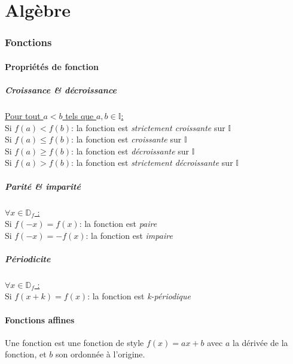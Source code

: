 \documentclass{article}
\begin{document}
\pagebreak

\tableofcontents

\pagebreak

\pagebreak\part{Algèbre}
\setcounter{section}{0}
\renewcommand*{\theHsection}{chX.\the\value{section}}
\section{Fonctions}


\subsection{Propriétés de fonction}

\subsubsection{Croissance \& décroissance}
\underline{Pour tout $a<b$ tels que $a,b\in\mathbb{I}$:}\\
Si $f(a) < f(b)$: la fonction est \emph{strictement croissante} sur $\mathbb{I}$\\
Si $f(a) \le f(b)$: la fonction est \emph{croissante} sur $\mathbb{I}$\\
Si $f(a) \ge f(b)$: la fonction est \emph{décroissante} sur $\mathbb{I}$\\
Si $f(a) > f(b)$: la fonction est \emph{strictement décroissante} sur $\mathbb{I}$\\

\subsubsection{Parité \& imparité}
\underline{$\forall x \in \mathbb{D}_f$ :}\\
Si $f(-x) = f(x)$: la fonction est \emph{paire}\\
Si $f(-x) = -f(x)$: la fonction est \emph{impaire}

\subsubsection{Périodicite}
\underline{$\forall x \in \mathbb{D}_f$ :}\\
Si $f(x + k) = f(x)$: la fonction est \emph{k-périodique}


\subsection{Fonctions affines}
Une fonction est une fonction de style $f(x) = ax+b$ avec $a$ la dérivée de la fonction, et $b$ son ordonnée à l'origine.
\end{document}
